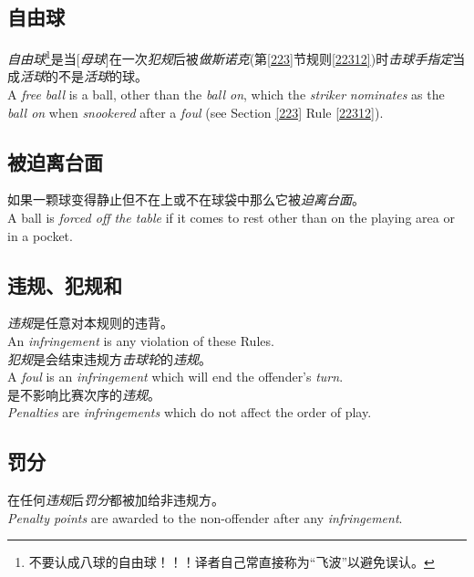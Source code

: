 \subsection{自由球}

\noindent \textit{自由球}\footnote{不要认成八球的自由球！！！译者自己常直接称为“飞波”以避免误认。}是当[\textit{母球}]在一次\textit{犯规}后被\textit{做斯诺克}(\see{}第\ref{223}节规则\ref{22312})时\textit{击球手}\textit{指定}当成\textit{活球}的不是\textit{活球}的球。\\
A \textit{free ball} is a ball, other than the \textit{ball on}, which the \textit{striker} \textit{nominates} as the \textit{ball on} when \textit{snookered} after a \textit{foul} (see Section \ref{223} Rule \ref{22312}).

\subsection{被迫离台面}

\noindent 如果一颗球变得静止但不在\playingarea{}上或不在球袋中那么它被\textit{迫离台面}。\\
A ball is \textit{forced off the table} if it comes to rest other than on the 
playing area or in a pocket.

\subsection{违规、犯规和\termpenalty{}}

\noindent \textit{违规}是任意对本规则的违背。\\
An \textit{infringement} is any violation of these Rules.\\
\textit{犯规}是会结束违规方\textit{击球轮}的\textit{违规}。\\
A \textit{foul} is an \textit{infringement} which will end the offender's \textit{turn}.\\
\textit{\termpenalty{}}是不影响比赛次序的\textit{违规}。\\
\textit{Penalties} are \textit{infringements} which do not affect the order of play.

\subsection{罚分}

\noindent 在任何\textit{违规}后\textit{罚分}都被加给非违规方。\\
\textit{Penalty points} are awarded to the non-offender after any \textit{infringement}.

